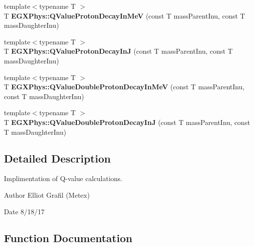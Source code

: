 \begin{DoxyCompactItemize}
\item 
\mbox{\label{_q_value_8hpp_adb53ee1b917c5a6a5d17443872f72c04}} 
{\footnotesize template$<$typename T $>$ }\\T {\bfseries E\+G\+X\+Phys\+::\+Q\+Value\+Proton\+Decay\+In\+MeV} (const T mass\+Parent\+Inu, const T mass\+Daughter\+Inu)
\item 
\mbox{\label{_q_value_8hpp_a60619e9c1249b20fa96fc24b27a117bb}} 
{\footnotesize template$<$typename T $>$ }\\T {\bfseries E\+G\+X\+Phys\+::\+Q\+Value\+Proton\+Decay\+InJ} (const T mass\+Parent\+Inu, const T mass\+Daughter\+Inu)
\item 
\mbox{\label{_q_value_8hpp_a1c6352b3ffeb132afe092dd6e9249dde}} 
{\footnotesize template$<$typename T $>$ }\\T {\bfseries E\+G\+X\+Phys\+::\+Q\+Value\+Double\+Proton\+Decay\+In\+MeV} (const T mass\+Parent\+Inu, const T mass\+Daughter\+Inu)
\item 
\mbox{\label{_q_value_8hpp_a2e778fe3f26cf7f03ea1b5734b9564d8}} 
{\footnotesize template$<$typename T $>$ }\\T {\bfseries E\+G\+X\+Phys\+::\+Q\+Value\+Double\+Proton\+Decay\+InJ} (const T mass\+Parent\+Inu, const T mass\+Daughter\+Inu)
\end{DoxyCompactItemize}


\subsection{Detailed Description}
Implimentation of Q-\/value calculations. 

\begin{DoxyAuthor}{Author}
Elliot Grafil (Metex) 
\end{DoxyAuthor}
\begin{DoxyDate}{Date}
8/18/17 
\end{DoxyDate}


\subsection{Function Documentation}
\mbox{\label{_q_value_8hpp_file_ab8a50c18f6de3c1b6ed280c26c3ff3a5}} 
